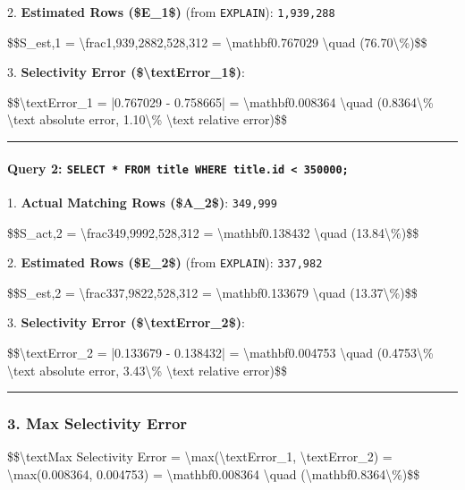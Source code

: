 \documentclass[11pt,a4paper]{article}
\begin{document}
{2. \textbf{Estimated Rows (\$E\_1\$)} (from \texttt{EXPLAIN}): \texttt{1,939,288}

\$\$S\_{est,1} = \textbackslash{}frac{1,939,288}{2,528,312} = \textbackslash{}mathbf{0.767029} \textbackslash{}quad (76.70\textbackslash{}\%)\$\$

3. \textbf{Selectivity Error (\$\textbackslash{}text{Error}\_1\$)}:

\$\$\textbackslash{}text{Error}\_1 = |0.767029 - 0.758665| = \textbackslash{}mathbf{0.008364} \textbackslash{}quad (0.8364\textbackslash{}\% \textbackslash{}text{ absolute error}, 1.10\textbackslash{}\% \textbackslash{}text{ relative error})\$\$


\hrule


\paragraph{\textbf{Query 2}: \texttt{SELECT * FROM title WHERE title.id < 350000;}}
1. \textbf{Actual Matching Rows (\$A\_2\$)}: \texttt{349,999}

\$\$S\_{act,2} = \textbackslash{}frac{349,999}{2,528,312} = \textbackslash{}mathbf{0.138432} \textbackslash{}quad (13.84\textbackslash{}\%)\$\$

2. \textbf{Estimated Rows (\$E\_2\$)} (from \texttt{EXPLAIN}): \texttt{337,982}

\$\$S\_{est,2} = \textbackslash{}frac{337,982}{2,528,312} = \textbackslash{}mathbf{0.133679} \textbackslash{}quad (13.37\textbackslash{}\%)\$\$

3. \textbf{Selectivity Error (\$\textbackslash{}text{Error}\_2\$)}:

\$\$\textbackslash{}text{Error}\_2 = |0.133679 - 0.138432| = \textbackslash{}mathbf{0.004753} \textbackslash{}quad (0.4753\textbackslash{}\% \textbackslash{}text{ absolute error}, 3.43\textbackslash{}\% \textbackslash{}text{ relative error})\$\$


\hrule


\subsubsection{3. Max Selectivity Error}

\$\$\textbackslash{}text{Max Selectivity Error} = \textbackslash{}max(\textbackslash{}text{Error}\_1, \textbackslash{}text{Error}\_2) = \textbackslash{}max(0.008364, 0.004753) = \textbackslash{}mathbf{0.008364} \textbackslash{}quad (\textbackslash{}mathbf{0.8364\textbackslash{}\%})\$\$


}
\end{document}
